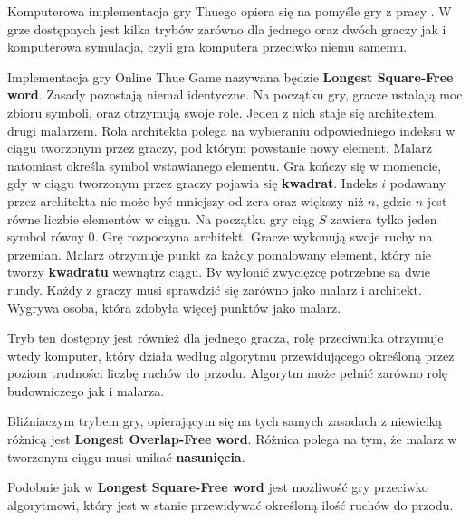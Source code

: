 \documentclass[document]{xmgr}
\begin{document}
Komputerowa implementacja gry Thuego opiera się na pomyśle gry z pracy \cite{thueonline}. W grze dostępnych jest kilka trybów zarówno dla jednego oraz dwóch graczy jak i komputerowa symulacja, czyli gra komputera przeciwko niemu samemu.

Implementacja gry Online Thue Game nazywana będzie \textbf{Longest Square-Free word}.
Zasady pozostają niemal identyczne. Na początku gry, gracze ustalają moc zbioru symboli, oraz otrzymują swoje role. Jeden z nich staje się architektem, drugi malarzem. Rola architekta polega na wybieraniu odpowiedniego indeksu w ciągu tworzonym przez graczy, pod którym powstanie nowy element. Malarz natomiast określa symbol wstawianego elementu. Gra kończy się w momencie, gdy w ciągu tworzonym przez graczy pojawia się \textbf{kwadrat}. Indeks $i$  podawany przez architekta nie może być mniejszy od zera oraz większy niż $n$, gdzie $n$ jest równe liczbie elementów w ciągu. Na początku gry ciąg $S$ zawiera tylko jeden symbol równy 0.
Grę rozpoczyna architekt. Gracze wykonują swoje ruchy na przemian. Malarz otrzymuje punkt za każdy pomalowany element, który nie tworzy \textbf{kwadratu} wewnątrz ciągu.
By wyłonić zwycięzcę potrzebne są dwie rundy. Każdy z graczy musi sprawdzić się zarówno jako malarz i architekt. Wygrywa osoba, która zdobyła więcej punktów jako malarz.

Tryb ten dostępny jest również dla jednego gracza, rolę przeciwnika otrzymuje wtedy komputer, który działa według algorytmu przewidującego określoną przez poziom trudności liczbę ruchów do przodu. Algorytm może pełnić zarówno rolę budowniczego jak i malarza.

Bliźniaczym trybem gry, opierającym się na tych samych zasadach z niewielką różnicą jest \textbf{Longest Overlap-Free word}. 
Różnica polega na tym, że malarz w tworzonym ciągu musi unikać \textbf{nasunięcia}.

Podobnie jak w \textbf{Longest Square-Free word} jest możliwość gry przeciwko algorytmowi, który jest w stanie przewidywać określoną ilość ruchów do przodu.
\end{document}
